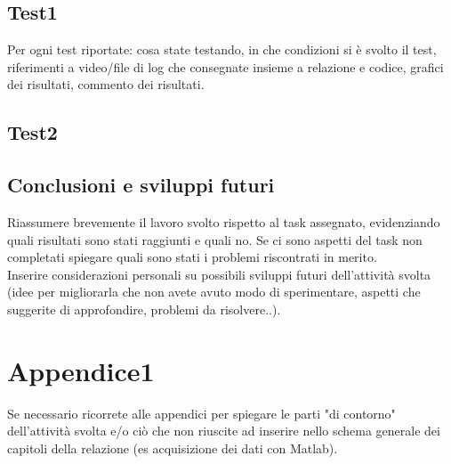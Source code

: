 \documentclass[11pt]{report}
\begin{document}
\section{Test1}
Per ogni test riportate: cosa state testando, in che condizioni si è svolto il test, riferimenti a video/file di log che consegnate insieme a relazione e codice, grafici dei risultati, commento dei risultati.

\section{Test2}

\newpage
{}
\section*{Conclusioni e sviluppi futuri}
Riassumere brevemente il lavoro svolto rispetto al task assegnato, evidenziando quali risultati sono stati raggiunti e quali no. Se ci sono aspetti del task non completati spiegare quali sono stati i problemi riscontrati in merito.\\
Inserire considerazioni personali su possibili sviluppi futuri dell'attività svolta (idee per migliorarla che non avete avuto modo di sperimentare, aspetti che suggerite di approfondire, problemi da risolvere..).

\appendix
\chapter{Appendice1}
Se necessario ricorrete alle appendici per spiegare le parti "di contorno" dell'attività svolta e/o ciò che non riuscite ad inserire nello schema generale dei capitoli della relazione (es acquisizione dei dati con Matlab).



 
\end{document}
